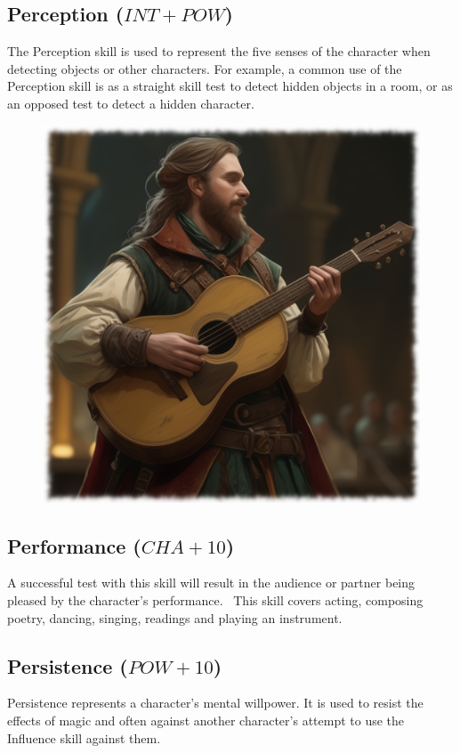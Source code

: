\subsection{Perception ($INT+POW$)}
The Perception skill is used to represent the five senses of the character when detecting objects or other characters. For example, a common use of the Perception skill is as a straight skill test to detect hidden objects in a room, or as an opposed test to detect a hidden character.

\begin{figure}[h]
\begin{center}
\includegraphics[scale=0.23]{img/ai-images/bard.png}
\end{center}
\end{figure}

\subsection{Performance ($CHA+10$)}
A successful test with this skill will result in the audience or partner being pleased by the character’s performance.  This skill covers acting, composing poetry, dancing, singing, readings and playing an instrument. 

\subsection{Persistence ($POW+10$)}
Persistence represents a character’s mental willpower. It is used to resist the effects of magic and often against another character’s attempt to use the Influence skill against them.  

